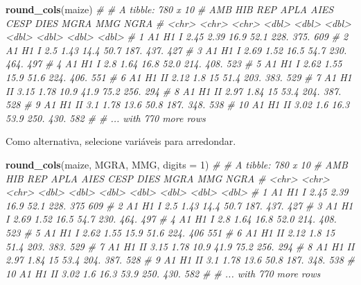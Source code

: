 \documentclass[
]{book}
\newenvironment{Shaded}{\begin{snugshade}}{\end{snugshade}}
\newcommand{\CommentTok}[1]{\textcolor[rgb]{0.56,0.35,0.01}{\textit{#1}}}
\newcommand{\DataTypeTok}[1]{\textcolor[rgb]{0.13,0.29,0.53}{#1}}
\newcommand{\DecValTok}[1]{\textcolor[rgb]{0.00,0.00,0.81}{#1}}
\newcommand{\KeywordTok}[1]{\textcolor[rgb]{0.13,0.29,0.53}{\textbf{#1}}}
\newcommand{\NormalTok}[1]{#1}
\numberwithin{equation}{section}
\begin{document}
\begin{Shaded}
\begin{Highlighting}[]
\KeywordTok{round\_cols}\NormalTok{(maize)}
\CommentTok{\# \# A tibble: 780 x 10}
\CommentTok{\#    AMB   HIB   REP    APLA  AIES  CESP  DIES  MGRA   MMG  NGRA}
\CommentTok{\#    \textless{}chr\textgreater{} \textless{}chr\textgreater{} \textless{}chr\textgreater{} \textless{}dbl\textgreater{} \textless{}dbl\textgreater{} \textless{}dbl\textgreater{} \textless{}dbl\textgreater{} \textless{}dbl\textgreater{} \textless{}dbl\textgreater{} \textless{}dbl\textgreater{}}
\CommentTok{\#  1 A1    H1    I      2.45  2.39  16.9  52.1 228.   375.   609}
\CommentTok{\#  2 A1    H1    I      2.5   1.43  14.4  50.7 187.   437.   427}
\CommentTok{\#  3 A1    H1    I      2.69  1.52  16.5  54.7 230.   464.   497}
\CommentTok{\#  4 A1    H1    I      2.8   1.64  16.8  52.0 214.   408.   523}
\CommentTok{\#  5 A1    H1    I      2.62  1.55  15.9  51.6 224.   406.   551}
\CommentTok{\#  6 A1    H1    II     2.12  1.8   15    51.4 203.   383.   529}
\CommentTok{\#  7 A1    H1    II     3.15  1.78  10.9  41.9  75.2  256.   294}
\CommentTok{\#  8 A1    H1    II     2.97  1.84  15    53.4 204.   387.   528}
\CommentTok{\#  9 A1    H1    II     3.1   1.78  13.6  50.8 187.   348.   538}
\CommentTok{\# 10 A1    H1    II     3.02  1.6   16.3  53.9 250.   430.   582}
\CommentTok{\# \# ... with 770 more rows}
\end{Highlighting}
\end{Shaded}

Como alternativa, selecione variáveis para arredondar.

\begin{Shaded}
\begin{Highlighting}[]
\KeywordTok{round\_cols}\NormalTok{(maize, MGRA, MMG, }\DataTypeTok{digits =} \DecValTok{1}\NormalTok{)}
\CommentTok{\# \# A tibble: 780 x 10}
\CommentTok{\#    AMB   HIB   REP    APLA  AIES  CESP  DIES  MGRA   MMG  NGRA}
\CommentTok{\#    \textless{}chr\textgreater{} \textless{}chr\textgreater{} \textless{}chr\textgreater{} \textless{}dbl\textgreater{} \textless{}dbl\textgreater{} \textless{}dbl\textgreater{} \textless{}dbl\textgreater{} \textless{}dbl\textgreater{} \textless{}dbl\textgreater{} \textless{}dbl\textgreater{}}
\CommentTok{\#  1 A1    H1    I      2.45  2.39  16.9  52.1 228.   375    609}
\CommentTok{\#  2 A1    H1    I      2.5   1.43  14.4  50.7 187.   437.   427}
\CommentTok{\#  3 A1    H1    I      2.69  1.52  16.5  54.7 230.   464.   497}
\CommentTok{\#  4 A1    H1    I      2.8   1.64  16.8  52.0 214.   408.   523}
\CommentTok{\#  5 A1    H1    I      2.62  1.55  15.9  51.6 224.   406    551}
\CommentTok{\#  6 A1    H1    II     2.12  1.8   15    51.4 203.   383.   529}
\CommentTok{\#  7 A1    H1    II     3.15  1.78  10.9  41.9  75.2  256.   294}
\CommentTok{\#  8 A1    H1    II     2.97  1.84  15    53.4 204.   387.   528}
\CommentTok{\#  9 A1    H1    II     3.1   1.78  13.6  50.8 187.   348.   538}
\CommentTok{\# 10 A1    H1    II     3.02  1.6   16.3  53.9 250.   430.   582}
\CommentTok{\# \# ... with 770 more rows}
\end{Highlighting}
\end{Shaded}
\end{document}
